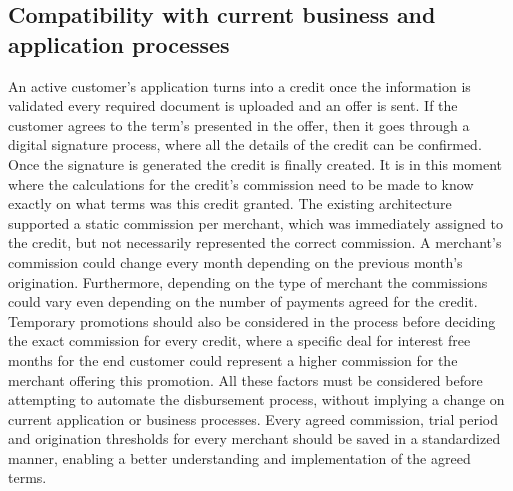 \subsection{Compatibility with current business and application processes}
An active customer’s application turns into a credit once the information is validated every required document is uploaded and an offer is sent. If the customer agrees to the term’s presented in the offer, then it goes through a digital signature process, where all the details of the credit can be confirmed. Once the signature is generated the credit is finally created. It is in this moment where the calculations for the credit’s commission need to be made to know exactly on what terms was this credit granted. The existing architecture supported a static commission per merchant, which was immediately assigned to the credit, but not necessarily represented the correct commission.
A merchant’s commission could change every month depending on the previous month’s origination. Furthermore, depending on the type of merchant the commissions could vary even depending on the number of payments agreed for the credit. Temporary promotions should also be considered in the process before deciding the exact commission for every credit, where a specific deal for interest free months for the end customer could represent a higher commission for the merchant offering this promotion.
All these factors must be considered before attempting to automate the disbursement process, without implying a change on current application or business processes. 
Every agreed commission, trial period and origination thresholds for every merchant should be saved in a standardized manner, enabling a better understanding and implementation of the agreed terms.

